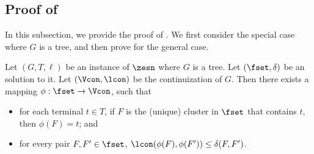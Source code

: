 \subsection{Proof of }
\label{subsec: diam-girth}


In this subsection, we provide the proof of . We first consider the special case where $G$ is a tree, and then prove  for the general case.

\begin{lemma} \label{lem:embed-tree}
Let $(G,T,\ell)$ be an instance of $\zesn$ where $G$ is a tree. Let $(\fset,\delta)$ be an solution to it. Let $(\Vcon, \lcon)$ be the continuization of $G$. Then there exists a mapping $\phi: \fset \to \Vcon$, such that
\begin{itemize}
	\item for each terminal $t\in T$, if $F$ is the (unique) cluster in $\fset$ that contains $t$, then $\phi(F)=t$; and
	\item for every pair $F,F'\in \fset$,
	$\lcon(\phi(F),\phi(F')) \le \delta(F,F')$.
\end{itemize}
\end{lemma}

